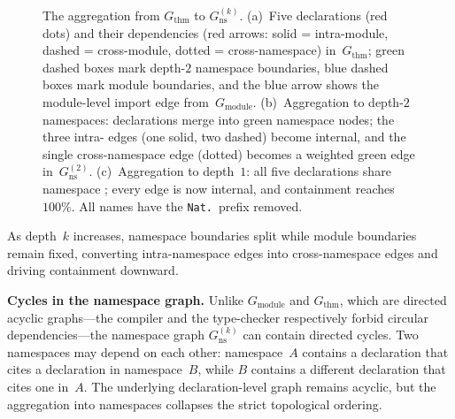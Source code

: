 \begin{figure}[ht]
\caption{The aggregation from $G_{\mathrm{thm}}$ to $G_{\mathrm{ns}}^{(k)}$. (a)~Five declarations (\textcolor{red!70!black}{red dots}) and their dependencies (\textcolor{red!70!black}{red arrows}: solid = intra-module, dashed = cross-module, dotted = cross-namespace) in~$G_{\mathrm{thm}}$; \textcolor{green!40!black}{green dashed boxes} mark depth-$2$ namespace boundaries, \textcolor{blue!60!black}{blue dashed boxes} mark module boundaries, and the \textcolor{blue!60!black}{blue arrow} shows the module-level import edge from~$G_{\mathrm{module}}$. (b)~Aggregation to depth-$2$ namespaces: declarations merge into \textcolor{green!50!black}{green namespace nodes}; the three intra- edges (one solid, two dashed) become internal, and the single cross-namespace edge (dotted) becomes a weighted \textcolor{green!50!black}{green edge} in~$G_{\mathrm{ns}}^{(2)}$. (c)~Aggregation to depth~$1$: all five declarations share namespace ; every edge is now internal, and containment reaches $100\%$. All names have the \texttt{Nat.}\ prefix removed.}
\label{fig:ns-aggregation}
\end{figure}

As depth~$k$ increases, namespace boundaries split while module boundaries remain fixed, converting intra-namespace edges into cross-namespace edges and driving containment downward.

\noindent\textbf{Cycles in the namespace graph.}
\label{rem:ns-cycles}
Unlike $G_{\mathrm{module}}$ and $G_{\mathrm{thm}}$, which are directed acyclic graphs---the compiler and the type-checker respectively forbid circular dependencies---the namespace graph $G_{\mathrm{ns}}^{(k)}$ can contain directed cycles. Two namespaces may depend on each other: namespace~$A$ contains a declaration that cites a declaration in namespace~$B$, while $B$ contains a different declaration that cites one in~$A$. The underlying declaration-level graph remains acyclic, but the aggregation into namespaces collapses the strict topological ordering.

